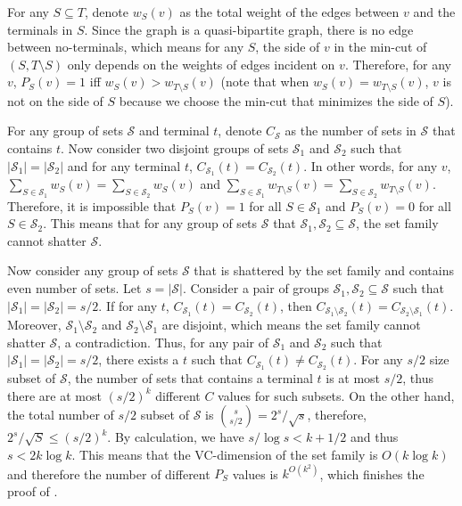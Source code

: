 \documentclass[11pt]{article}
\theoremstyle{definition}
\def\card#1{\left| #1 \right|}
\newcounter{note}
\begin{document}
For any $S \subseteq T$, denote $w_S(v)$ as the total weight of the edges between $v$ and the terminals in $S$. Since the graph is a quasi-bipartite graph, there is no edge between no-terminals, which means for any $S$, the side of $v$ in the min-cut of $(S,T \setminus S)$ only depends on the weights of edges incident on $v$. Therefore, for any $v$, $P_S(v)=1$ iff $w_S(v) > w_{T \setminus S}(v)$ (note that when $w_S(v) = w_{T \setminus S}(v)$, $v$ is not on the side of $S$ because we choose the min-cut that minimizes the side of $S$). 

For any group of sets $\mathcal{S}$ and terminal $t$, denote $C_{\mathcal{S}}$ as the number of sets in $\mathcal{S}$ that contains $t$. Now consider two disjoint groups of sets $\mathcal{S}_1$ and $\mathcal{S}_2$ such that $\card{\mathcal{S}_1} = \card{\mathcal{S}_2}$ and for any terminal $t$, $C_{\mathcal{S}_1}(t)=C_{\mathcal{S}_2}(t)$. In other words, for any $v$, $\sum_{S\in \mathcal{S}_1} w_{S}(v) = \sum_{S \in \mathcal{S}_2} w_{S}(v)$ and $\sum_{S \in \mathcal{S}_1} w_{T \setminus S}(v) = \sum_{S \in \mathcal{S}_2} w_{T \setminus S}(v)$. Therefore, it is impossible that $P_{S}(v)=1$ for all $S \in \mathcal{S}_1$ and $P_{S}(v)=0$ for all $S \in \mathcal{S}_2$. This means that for any group of sets $\mathcal{S}$ that $\mathcal{S}_1,\mathcal{S}_2 \subseteq \mathcal{S}$, the set family cannot shatter $\mathcal{S}$.

Now consider any group of sets $\mathcal{S}$ that is shattered by the set family and contains even number of sets. Let $s=\card{\mathcal{S}}$. Consider a pair of groups $\mathcal{S}_1,\mathcal{S}_2 \subseteq \mathcal{S}$ such that $\card{\mathcal{S}_1} = \card{\mathcal{S}_2} = s/2$. If for any $t$, $C_{\mathcal{S}_1}(t) = C_{\mathcal{S}_2}(t)$, then $C_{\mathcal{S}_1 \setminus \mathcal{S}_2}(t) = C_{\mathcal{S}_2 \setminus \mathcal{S}_1}(t)$. Moreover, $\mathcal{S}_1 \setminus \mathcal{S}_2$ and $\mathcal{S}_2 \setminus \mathcal{S}_1$ are disjoint, which means the set family cannot shatter $\mathcal{S}$, a contradiction. Thus, for any pair of $\mathcal{S}_1$ and $\mathcal{S}_2$ such that $\card{\mathcal{S}_1} = \card{\mathcal{S}_2} = s/2$, there exists a $t$ such that $C_{\mathcal{S}_1}(t) \neq C_{\mathcal{S}_2}(t)$. For any $s/2$ size subset of $\mathcal{S}$, the number of sets that contains a terminal $t$ is at most $s/2$, thus there are at most $(s/2)^k$ different $C$ values for such subsets. On the other hand, the total number of $s/2$ subset of $\mathcal{S}$ is $\binom{s}{s/2} = 2^s/\sqrt{s}$, therefore, $2^s/\sqrt{S} \le (s/2)^k$. By calculation, we have $s/\log s < k + 1/2$ and thus $s < 2 k \log k$. This means that the VC-dimension of the set family is $O(k \log k)$ and therefore the number of different $P_S$ values is $k^{O(k^2)}$, which finishes the proof of .
\fi 
\end{document}
